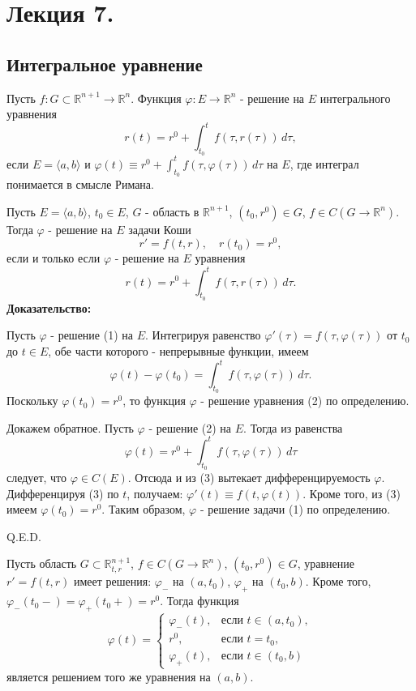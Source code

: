 
\section{Лекция 7.}
\subsection{Интегральное уравнение}
  Пусть $f: G \subset \mathbb{R}^{n+1} \to \mathbb{R}^n$. Функция $\varphi: E \to \mathbb{R}^n$ - решение на $E$ интегрального уравнения
$$r(t) = r^0 + \int_{t_0}^{t} f(\tau, r(\tau))\,d\tau,$$
если $E = \langle a, b \rangle$ и $\varphi(t) \equiv r^0 + \int_{t_0}^{t} f(\tau, \varphi(\tau))\,d\tau$ на $E$, где интеграл понимается в смысле Римана. 



Пусть $E = \langle a, b \rangle$, $t_0 \in E$, $G$ - область в $\mathbb{R}^{n+1}$, $(t_0, r^0) \in G$, $f \in C(G \to \mathbb{R}^n)$. Тогда $\varphi$ - решение на $E$ задачи Коши
$$r' = f(t, r), \quad r(t_0) = r^0,$$
если и только если $\varphi$ - решение на $E$ уравнения
$$r(t) = r^0 + \int_{t_0}^{t} f(\tau, r(\tau))\,d\tau.$$
\textbf{Доказательство:}

Пусть $\varphi$ - решение (1) на $E$. Интегрируя равенство $\varphi'(\tau) = f(\tau, \varphi(\tau))$ от $t_0$ до $t \in E$, обе части которого - непрерывные функции, имеем
$$\varphi(t) - \varphi(t_0) = \int_{t_0}^{t} f(\tau, \varphi(\tau))\,d\tau.$$
Поскольку $\varphi(t_0) = r^0$, то функция $\varphi$ - решение уравнения (2) по определению. 

Докажем обратное. Пусть $\varphi$ - решение (2) на $E$.  Тогда из равенства
$$\varphi(t) = r^0 + \int_{t_0}^{t} f(\tau, \varphi(\tau))\,d\tau $$
следует, что $\varphi \in C(E)$.  Отсюда и из (3) вытекает дифференцируемость $\varphi$. Дифференцируя (3) по $t$, получаем: $\varphi'(t) \equiv f(t, \varphi(t))$. Кроме того, из (3) имеем $\varphi(t_0) = r^0$. Таким образом, $\varphi$ - решение задачи (1) по определению. 

\hfill Q.E.D.


Пусть область $G \subset \mathbb{R}^{n+1}_{t,r}$, $f \in C(G \to \mathbb{R}^n)$, $(t_0, r^0) \in G$, уравнение $r' = f(t, r)$ имеет решения: $\varphi_-$ на $(a, t_0)$, $\varphi_+$ на $(t_0, b)$. Кроме того, $\varphi_-(t_0-) = \varphi_+(t_0+) = r^0$.  Тогда функция
\begin{equation*}\varphi(t) = 
\begin{cases}
\varphi_-(t), & \text{если } t \in (a, t_0), \\
r^0, & \text{если } t = t_0, \\
\varphi_+(t), & \text{если } t \in (t_0, b)
\end{cases}
\end{equation*}
является решением того же уравнения на $(a, b)$.

